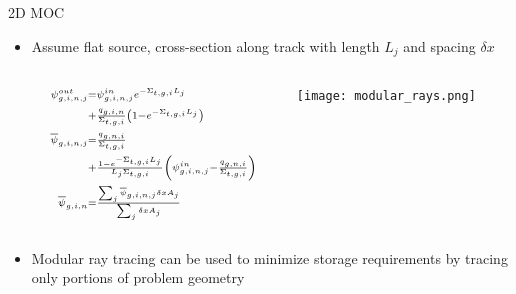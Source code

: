 \begin{frame}[t]{2D MOC}

    \begin{itemize}
      \item Assume flat source, cross-section along track with 
      length $L_j$ and spacing $\delta x$
      \begin{columns}
        \begin{column}{0.6\textwidth}
      \begin{align*}\scriptstyle
      \psi^{out}_{g,i,n,j} &\scriptstyle = \psi^{in}_{g,i,n,j}e^{-\Sigma_{t,g,i} 
      L_j} 
      \\\scriptstyle
      &\scriptstyle + \frac{q_{g,i,n}}{\Sigma_{t,g,i}}\left(1 - 
      e^{-\Sigma_{t,g,i}L_j}\right) \\\scriptstyle
      \overline{\psi}_{g,i,n,j} &\scriptstyle = 
      \frac{q_{g,n,i}}{\Sigma_{t,g,i}} 
      \\\scriptstyle
      &\scriptstyle + \frac{1 - e^{-\Sigma_{t,g,i} 
          L_j}}{L_j\Sigma_{t,g,i}}\left(\psi^{in}_{g,i,n,j} - 
      \frac{q_{g,n,i}}{\Sigma_{t,g,i}}\right) \\\scriptstyle
      \overline{\psi}_{g,i,n} &\scriptstyle = \frac{\sum_j 
      \overline{\psi}_{g,i,n,j} \delta x A_j}{\sum_j \delta x A_j}
      \end{align*}
    \end{column}
  \begin{column}{0.4\textwidth}
  \texttt{[image: modular\_rays.png]}
\end{column}
\end{columns}
      \item Modular ray tracing can be used to minimize storage requirements by 
      tracing only portions of problem geometry
    \end{itemize}

\end{frame} 


